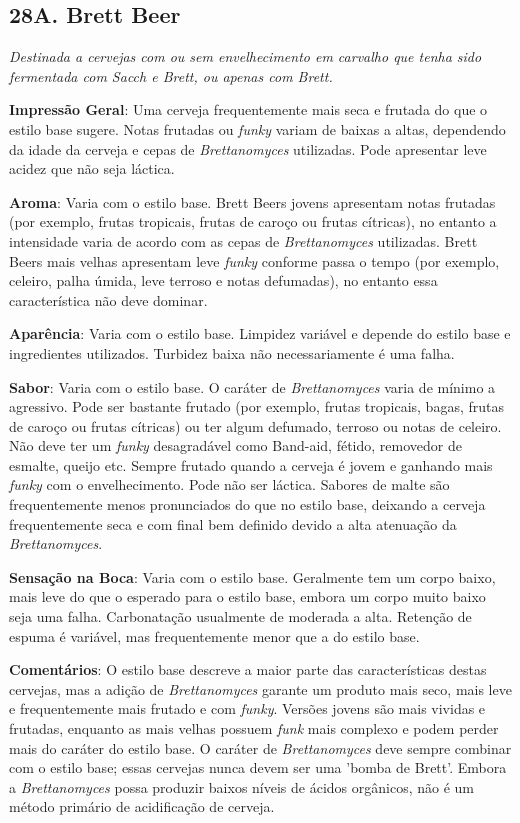 \subsection*{28A. Brett Beer}
\textit{Destinada a cervejas com ou sem envelhecimento em carvalho que tenha sido fermentada com Sacch e Brett, ou apenas com Brett.}

\textbf{Impressão Geral}: Uma cerveja frequentemente mais seca e frutada do que o estilo base sugere. Notas frutadas ou \textit{funky} variam de baixas a altas, dependendo da idade da cerveja e cepas de \textit{Brettanomyces} utilizadas. Pode apresentar leve acidez que não seja láctica.

\textbf{Aroma}: Varia com o estilo base. Brett Beers jovens apresentam notas frutadas (por exemplo, frutas tropicais, frutas de caroço ou frutas cítricas), no entanto a intensidade varia de acordo com as cepas de \textit{Brettanomyces} utilizadas. Brett Beers mais velhas apresentam leve \textit{funky} conforme passa o tempo (por exemplo, celeiro, palha úmida, leve terroso e notas defumadas), no entanto essa característica não deve dominar.

\textbf{Aparência}: Varia com o estilo base. Limpidez variável e depende do estilo base e ingredientes utilizados. Turbidez baixa não necessariamente é uma falha.

\textbf{Sabor}: Varia com o estilo base. O caráter de \textit{Brettanomyces} varia de mínimo a agressivo. Pode ser bastante frutado (por exemplo, frutas tropicais, bagas, frutas de caroço ou frutas cítricas) ou ter algum defumado, terroso ou notas de celeiro. Não deve ter um \textit{funky} desagradável como Band-aid, fétido, removedor de esmalte, queijo etc. Sempre frutado quando a cerveja é jovem e ganhando mais \textit{funky} com o envelhecimento. Pode não ser láctica. Sabores de malte são frequentemente menos pronunciados do que no estilo base, deixando a cerveja frequentemente seca e com final bem definido devido a alta atenuação da \textit{Brettanomyces}.

\textbf{Sensação na Boca}: Varia com o estilo base. Geralmente tem um corpo baixo, mais leve do que o esperado para o estilo base, embora um corpo muito baixo seja uma falha. Carbonatação usualmente de moderada a alta. Retenção de espuma é variável, mas frequentemente menor que a do estilo base.

\textbf{Comentários}: O estilo base descreve a maior parte das características destas cervejas, mas a adição de \textit{Brettanomyces} garante um produto mais seco, mais leve e frequentemente mais frutado e com \textit{funky}. Versões jovens são mais vividas e frutadas, enquanto as mais velhas possuem \textit{funk} mais complexo e podem perder mais do caráter do estilo base. O caráter de \textit{Brettanomyces} deve sempre combinar com o estilo base; essas cervejas nunca devem ser uma 'bomba de Brett'. Embora a \textit{Brettanomyces} possa produzir baixos níveis de ácidos orgânicos, não é um método primário de acidificação de cerveja.

